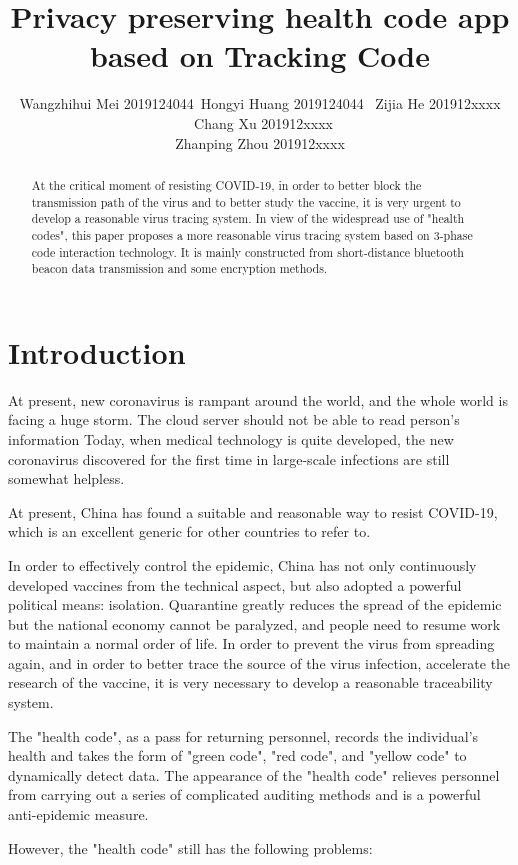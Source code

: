 \documentclass[11pt,en]{elegantpaper}
\title{Privacy preserving health code app based on Tracking Code}
\author{Wangzhihui Mei 2019124044\ Hongyi Huang 2019124044 \ Zijia He 201912xxxx \ Chang Xu 201912xxxx\\ Zhanping Zhou 201912xxxx}
\institute{CCNU-UOW JI}
\date{}
\begin{document}
\maketitle

\begin{abstract}
	At the critical moment of resisting COVID-19, in order to better block the transmission path of the virus and to better study the vaccine, it is very urgent to develop a reasonable virus tracing system\cite{guan2020clinical}. In view of the widespread use of "health codes", this paper proposes a more reasonable virus tracing system based on 3-phase code interaction technology. It is mainly constructed from short-distance bluetooth beacon data transmission and some encryption methods.
\end{abstract}

\section{Introduction}
At present, new coronavirus is rampant around the world, and the whole world is facing a huge storm. The cloud server should not be able to read person’s information Today, when medical technology is quite developed, the new coronavirus discovered for the first time in large-scale infections are still somewhat helpless.

At present, China has found a suitable and reasonable way to resist COVID-19, which is an excellent generic for other countries to refer to.

In order to effectively control the epidemic, China has not only continuously developed vaccines from the technical aspect, but also adopted a powerful political means: isolation. Quarantine greatly reduces the spread of the epidemic but the national economy cannot be paralyzed, and people need to resume work to maintain a normal order of life. In order to prevent the virus from spreading again, and in order to better trace the source of the virus infection, accelerate the research of the vaccine, it is very necessary to develop a reasonable traceability system.

The "health code", as a pass for returning personnel, records the individual's health and takes the form of "green code", "red code", and "yellow code" to dynamically detect data. The appearance of the "health code" relieves personnel from carrying out a series of complicated auditing methods and is a powerful anti-epidemic measure.

However, the "health code" still has the following problems:
\end{document}
